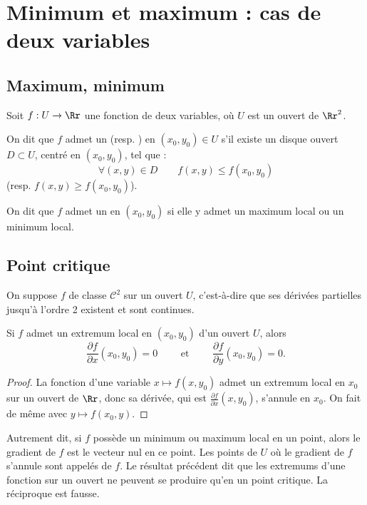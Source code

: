 \section{Minimum et maximum : cas de deux variables}

\subsection{Maximum, minimum}
Soit $f:U\to \Rr$ une fonction de deux variables, o\`u $U$ est un ouvert de $\Rr^2$.

\begin{definition}{}{}
	On dit que $f$ admet un  (resp. ) en $(x_0,y_0)\in U$ s'il existe un disque ouvert $D\subset U$, centré en $(x_0,y_0)$, tel que :
    $$\forall (x,y)\in D \qquad f(x,y) \le f(x_0,y_0)$$
     (resp. $f(x,y) \ge f(x_0,y_0)$).

On dit que $f$ admet un  en $(x_0,y_0)$ si elle y admet un maximum local ou un minimum local.
\end{definition}


\subsection{Point critique}

On suppose $f$ de classe $\mathcal{C}^2$ sur un ouvert $U$, c'est-à-dire que ses dérivées partielles jusqu'à l'ordre 2 existent et sont continues.


\begin{proposition}{}{}
	Si $f$ admet un extremum local en $(x_0,y_0)$ d'un ouvert $U$, alors $$\frac{\partial f}{\partial x}(x_0,y_0) = 0 \qquad \text{ et  } \qquad \frac{\partial f}{\partial y} (x_0,y_0) = 0.$$
\end{proposition}

\begin{proof}
    La fonction d'une variable $x\mapsto f(x,y_0)$ admet un extremum local en $x_0$ sur un ouvert de $\Rr$, donc sa dérivée, qui est $\frac{\partial f}{\partial x}  (x,y_0)$, s'annule en $x_0$. On fait de même avec $y\mapsto f(x_0,y)$.
\end{proof}

Autrement dit, si $f$ possède un minimum ou maximum local en un point, alors le gradient de $f$ est le vecteur nul en ce point.
Les points de $U$ où le gradient de $f$ s'annule sont appelés  de $f$. Le résultat précédent dit que les extremums d'une fonction sur un ouvert ne peuvent se produire qu'en un point critique. La réciproque est fausse.

